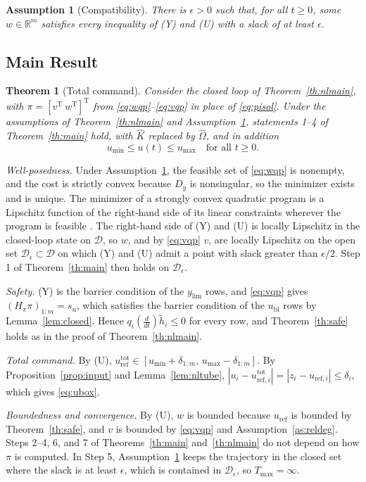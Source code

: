 \documentclass[lettersize,journal]{IEEEtran}
\newtheorem{assumption}{Assumption}
\newtheorem{theorem}{Theorem}
\newcommand{\Kh}{\hat{K}}
\newcommand{\ub}{u_{\mathrm{bl}}}
\newcommand{\uref}{u_{\mathrm{ref}}}
\newcommand{\utot}{u_{\mathrm{ref}}^{\mathrm{tot}}}
\newcommand{\ylim}{y_{\mathrm{lim}}}
\newcommand{\T}{\mathrm{T}}
\newcommand{\R}{\mathbb{R}}
\begin{document}
\begin{assumption}[Compatibility] \label{as:compat}
There is $\epsilon>0$ such that, for all $t\ge0$, some $w\in\R^m$ satisfies every inequality of (Y) and (U) with a slack of at least $\epsilon$.
\end{assumption}

\subsection{Main Result}

\begin{theorem}[Total command] \label{th:total}
Consider the closed loop of Theorem~\ref{th:nlmain}, with $\pi=[v^\T\ w^\T]^\T$ from \eqref{eq:wqp}--\eqref{eq:vqp} in place of \eqref{eq:pisol}. Under the assumptions of Theorem~\ref{th:nlmain} and Assumption~\ref{as:compat}, statements 1--4 of Theorem~\ref{th:main} hold, with $\Kh$ replaced by $\hat\Omega$, and in addition
\begin{equation}
u_{\min}\le u(t)\le u_{\max}\quad\text{for all }t\ge0. \label{eq:ubox}
\end{equation}
\end{theorem}
\begin{IEEEproof}
\emph{Well-posedness.} Under Assumption~\ref{as:compat}, the feasible set of \eqref{eq:wqp} is nonempty, and the cost is strictly convex because $D_y$ is nonsingular, so the minimizer exists and is unique. The minimizer of a strongly convex quadratic program is a Lipschitz function of the right-hand side of its linear constraints wherever the program is feasible \cite{mangasarian1987}. The right-hand side of (Y) and (U) is locally Lipschitz in the closed-loop state on $\mathcal{D}$, so $w$, and by \eqref{eq:vqp} $v$, are locally Lipschitz on the open set $\mathcal{D}_\epsilon\subset\mathcal{D}$ on which (Y) and (U) admit a point with slack greater than $\epsilon/2$. Step 1 of Theorem~\ref{th:main} then holds on $\mathcal{D}_\epsilon$.

\emph{Safety.} (Y) is the barrier condition of the $\ylim$ rows, and \eqref{eq:vqp} gives $(H_\pi\pi)_{1:m}=s_u$, which satisfies the barrier condition of the $\ub$ rows by Lemma~\ref{lem:closed}. Hence $q_i(\frac{d}{dt})\tilde h_i\le0$ for every row, and Theorem~\ref{th:safe} holds as in the proof of Theorem~\ref{th:nlmain}.

\emph{Total command.} By (U), $\utot\in[u_{\min}+\delta_{1:m},\,u_{\max}-\delta_{1:m}]$. By Proposition~\ref{prop:input} and Lemma~\ref{lem:nltube}, $|u_i-u^{\mathrm{tot}}_{\mathrm{ref},i}|=|z_i-u_{\mathrm{ref},i}|\le\delta_i$, which gives \eqref{eq:ubox}.

\emph{Boundedness and convergence.} By (U), $w$ is bounded because $\uref$ is bounded by Theorem~\ref{th:safe}, and $v$ is bounded by \eqref{eq:vqp} and Assumption~\ref{as:reldeg}. Steps 2--4, 6, and 7 of Theorems~\ref{th:main} and~\ref{th:nlmain} do not depend on how $\pi$ is computed. In Step 5, Assumption~\ref{as:compat} keeps the trajectory in the closed set where the slack is at least $\epsilon$, which is contained in $\mathcal{D}_\epsilon$, so $T_{\max}=\infty$.
\end{IEEEproof}
\end{document}
